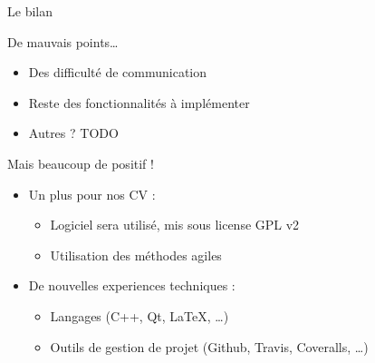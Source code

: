 \begin{frame}{Le bilan} %
	\begin{alertblock}{De mauvais points…}
		\begin{itemize}
			\item Des difficulté de communication
			\item Reste des fonctionnalités à implémenter 
			\item Autres ? TODO %
		\end{itemize}
	\end{alertblock}
	\vfill
	\pause
	\begin{exampleblock}{Mais beaucoup de positif !}
		\begin{itemize}
			\item Un plus pour nos CV :
				\begin{itemize}
					\item Logiciel sera utilisé, mis sous license GPL v2
					\item Utilisation des méthodes agiles
				\end{itemize}
	
			\item De nouvelles experiences techniques :
				\begin{itemize}
					\item Langages (C++, Qt, \LaTeX{}, \ldots)
					\item Outils de gestion de projet (Github, Travis, Coveralls, \ldots)
				\end{itemize}
		\end{itemize}
	\end{exampleblock}

	\vfill
\end{frame}

